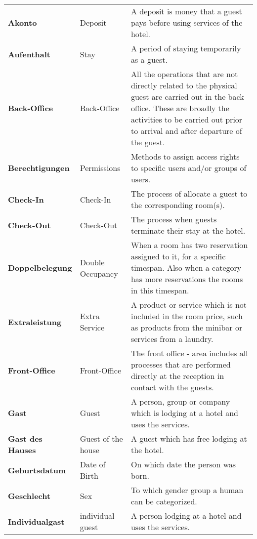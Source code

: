 \documentclass[../Pflichtenheft.tex]{subfiles}
\begin{document}
    \begin{longtable}{p{4cm} p{4cm} p{6cm}}
        \textbf{Akonto} & {Deposit} & A deposit is money that a guest pays before using services of the hotel. \\[0.5cm]
        \textbf{Aufenthalt} & {Stay} & A period of staying temporarily as a guest. \\[0.5cm]
        \textbf{Back-Office} & {Back-Office} & All the operations that are not directly related to the physical guest are carried out in the back office. These are broadly the activities to be carried out prior to arrival and after departure of the guest. \\[0.5cm]
        \textbf{Berechtigungen} & {Permissions} & Methods to assign access rights to specific users and/or groups of users. \\[0.5cm]
        \textbf{Check-In} & {Check-In} & The process of allocate a guest to the corresponding room(s). \\[0.5cm]
        \textbf{Check-Out} & {Check-Out} & The process when guests terminate their stay at the hotel. \\[0.5cm]
        \textbf{Doppelbelegung} & {Double Occupancy} & When a room has two reservation assigned to it, for a specific timespan. Also when a category has more reservations the rooms in this timespan. \\[0.5cm]
        \textbf{Extraleistung} & {Extra Service} & A product or service which is not included in the room price, such as products from the minibar or services from a laundry. \\[0.5cm]
        \textbf{Front-Office} & {Front-Office} & The front office - area includes all processes that are performed directly at the reception in contact with the guests. \\[0.5cm]
        \textbf{Gast} & {Guest} & A person, group or company which is lodging at a hotel and uses the services. \\[0.5cm]
        \textbf{Gast des Hauses} & {Guest of the house} & A guest which has free lodging at the hotel. \\[0.5cm]
        \textbf{Geburtsdatum} & {Date of Birth} & On which date the person was born. \\[0.5cm]
        \textbf{Geschlecht} & {Sex} & To which gender group a human can be categorized. \\[0.5cm]
        \textbf{Individualgast} & {individual guest} & A person lodging at a hotel and uses the services. \\[0.5cm]

\end{longtable}
\end{document}
